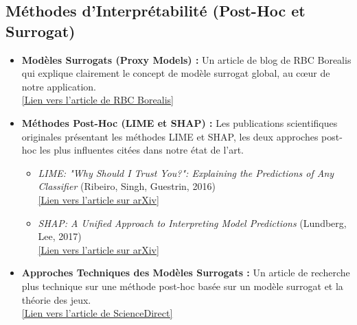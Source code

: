 \documentclass{article}
\begin{document}
\subsection*{Méthodes d'Interprétabilité (Post-Hoc et Surrogat)}

\begin{itemize}
    \item \textbf{Modèles Surrogats (Proxy Models) :} Un article de blog de RBC Borealis qui explique clairement le concept de modèle surrogat global, au cœur de notre application. \\
    \href{https://rbcborealis.com/research-blogs/explainability-ii-global-explanations-proxy-models-and-interpretable-models/}{[Lien vers l'article de RBC Borealis]}

    \item \textbf{Méthodes Post-Hoc (LIME et SHAP) :} Les publications scientifiques originales présentant les méthodes LIME et SHAP, les deux approches post-hoc les plus influentes citées dans notre état de l'art.
    \begin{itemize}
        \item \textit{LIME: "Why Should I Trust You?": Explaining the Predictions of Any Classifier} (Ribeiro, Singh, Guestrin, 2016) \\
        \href{https://arxiv.org/abs/1602.04938}{[Lien vers l'article sur arXiv]}
        \item \textit{SHAP: A Unified Approach to Interpreting Model Predictions} (Lundberg, Lee, 2017) \\
        \href{https://arxiv.org/abs/1705.07874}{[Lien vers l'article sur arXiv]}
    \end{itemize}

    \item \textbf{Approches Techniques des Modèles Surrogats :} Un article de recherche plus technique sur une méthode post-hoc basée sur un modèle surrogat et la théorie des jeux. \\
    \href{https://www.sciencedirect.com/science/article/abs/pii/S0925231224007409}{[Lien vers l'article de ScienceDirect]}
\end{itemize}
\end{document}

